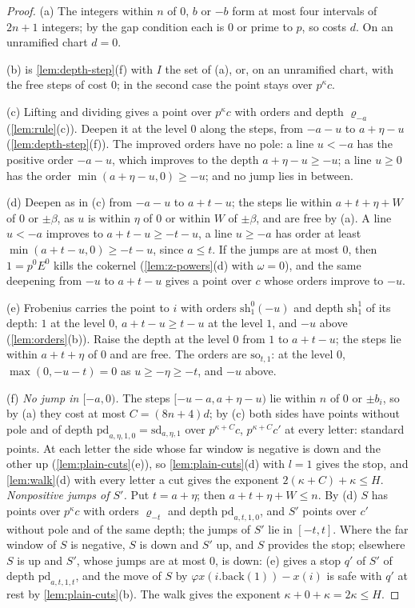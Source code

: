 \begin{proof}
(a) The integers within $n$ of $0$, $b$ or $-b$ form at most four intervals of $2n+1$ integers; by the gap condition each is $0$ or prime to $p$, so costs $d$. On an unramified chart $d=0$.

(b) is \cref{lem:depth-step}(f) with $I$ the set of (a), or, on an unramified chart, with the free steps of cost $0$; in the second case the point stays over $p^\kappa c$.

(c) Lifting and dividing gives a point over $p^\kappa c$ with orders and depth $\varrho_{-a}$ (\cref{lem:rule}(c)). Deepen it at the level $0$ along the steps, from $-a-u$ to $a+\eta-u$ (\cref{lem:depth-step}(f)). The improved orders have no pole: a line $u<-a$ has the positive order $-a-u$, which improves to the depth $a+\eta-u\ge-u$; a line
$u\ge0$ has the order $\min(a+\eta-u,0)\ge-u$; and no jump lies in between.

(d) Deepen as in (c) from $-a-u$ to $a+t-u$; the steps lie within $a+t+\eta+W$ of $0$ or $\pm\beta$, as $u$ is within $\eta$ of $0$ or within $W$ of $\pm\beta$, and are free by (a). A line $u<-a$ improves to $a+t-u\ge-t-u$, a line $u\ge-a$ has order at least $\min(a+t-u,0)\ge-t-u$, since $a\le t$. If the jumps are at most $0$, then
$1=p^0E^0$ kills the cokernel (\cref{lem:z-powers}(d) with $\omega=0$), and the same deepening from $-u$ to $a+t-u$ gives a point over $c$ whose orders improve to $-u$.

(e) Frobenius carries the point to $i$ with orders $\mathrm{sh}^0_1(-u)$ and depth $\mathrm{sh}^1_1$ of its depth: $1$ at the level $0$, $a+t-u\ge t-u$ at the level $1$, and $-u$ above (\cref{lem:orders}(b)). Raise the depth at the level $0$ from $1$ to $a+t-u$; the steps lie within $a+t+\eta$ of $0$ and are free. The orders are
$\mathrm{so}_{t,1}$: at the level $0$, $\max(0,-u-t)=0$ as $u\ge-\eta\ge-t$, and $-u$ above.

(f) \emph{No jump in $[-a,0)$.} The steps $[-u-a,a+\eta-u)$ lie within $n$ of $0$ or $\pm b_i$, so by (a) they cost at most $C=(8n+4)d$; by (c) both sides have points without pole and of depth $\mathrm{pd}_{a,\eta,1,0}=\mathrm{sd}_{a,\eta,1}$ over $p^{\kappa+C}c$, $p^{\kappa+C}c'$ at every letter: standard points. At each
letter the side whose far window is negative is down and the other up (\cref{lem:plain-cuts}(e)), so \cref{lem:plain-cuts}(d) with $l=1$ gives the stop, and \cref{lem:walk}(d) with every letter a cut gives the exponent $2(\kappa+C)+\kappa\le H$. \emph{Nonpositive jumps of $S'$.} Put $t=a+\eta$; then $a+t+\eta+W\le n$. By (d)
$S$ has points over $p^\kappa c$ with orders $\varrho_{-t}$ and depth $\mathrm{pd}_{a,t,1,0}$, and $S'$ points over $c'$ without pole and of the same depth; the jumps of $S'$ lie in $[-t,t]$. Where the far window of $S$ is negative, $S$ is down and $S'$ up, and $S$ provides the stop; elsewhere $S$ is up and $S'$, whose jumps are at most
$0$, is down: (e) gives a stop $q'$ of $S'$ of depth $\mathrm{pd}_{a,t,1,t}$, and the move of $S$ by $\varphi x(i.\mathrm{back}(1))-x(i)$ is safe with $q'$ at rest by \cref{lem:plain-cuts}(b). The walk gives the exponent $\kappa+0+\kappa=2\kappa\le H$.
\end{proof}

